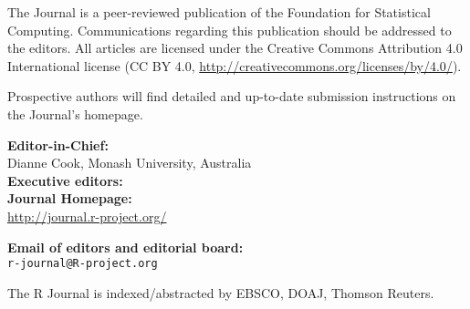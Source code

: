 \documentclass[a4paper,twoside]{report}
\begin{document}
\sectionhead{}

\titlepage

\vspace*{1in}
\begin{center}
\begin{minipage}{0.65\textwidth}
    \begin{center}
    The \R{} Journal is a peer-reviewed publication of
    the \R{} Foundation for Statistical Computing. Communications
    regarding this publication should be addressed to the editors. All
    articles are licensed under the Creative Commons Attribution 4.0
    International license (CC BY 4.0, \url{http://creativecommons.org/licenses/by/4.0/}).
    \bigskip

    Prospective authors will find detailed and up-to-date submission
    instructions on the Journal's homepage.


    \bigskip
      \textbf{Editor-in-Chief:}\\
              Dianne Cook, Monash University, Australia
      \\

    \bigskip
      \textbf{Executive editors:}\\
      



    \bigskip
    \textbf{\R{} Journal Homepage:}\\
    \url{http://journal.r-project.org/}

    \bigskip
    \textbf{Email of editors and editorial board:}\\
    \texttt{r-journal@R-project.org}

    \bigskip The R Journal is indexed/abstracted by EBSCO, DOAJ, Thomson Reuters.


\end{center}
\end{minipage}
\end{center}
\end{document}
